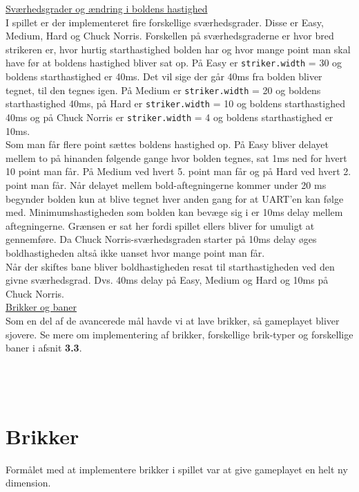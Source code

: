 \underline{Sværhedsgrader og ændring i boldens hastighed}\\

I spillet er der implementeret fire forskellige sværhedsgrader. Disse er Easy, Medium, Hard og Chuck Norris. Forskellen på sværhedsgraderne er hvor bred strikeren er, hvor hurtig starthastighed bolden har og hvor mange point man skal have før at boldens hastighed bliver sat op. På Easy er \texttt{striker.width} = 30 og boldens starthastighed er 40ms. Det vil sige der går 40ms fra bolden bliver tegnet, til den tegnes igen. På Medium er \texttt{striker.width} = 20 og boldens starthastighed 40ms, på Hard er \texttt{striker.width} = 10 og boldens starthastighed 40ms og på Chuck Norris er \texttt{striker.width} = 4 og boldens starthastighed er 10ms.\\

Som man får flere point sættes boldens hastighed op. På Easy bliver delayet mellem to på hinanden følgende gange hvor bolden tegnes, sat 1ms ned for hvert 10 point man får. På Medium ved hvert 5. point man får og på Hard ved hvert 2. point man får. Når delayet mellem bold-aftegningerne kommer under 20 ms begynder bolden kun at blive tegnet hver anden gang for at UART'en kan følge med. Minimumshastigheden som bolden kan bevæge sig i er 10ms delay mellem aftegningerne. Grænsen er sat her fordi spillet ellers bliver for umuligt at gennemføre. Da Chuck Norris-sværhedsgraden starter på 10ms delay øges boldhastigheden altså ikke uanset hvor mange point man får.\\
Når der skiftes bane bliver boldhastigheden resat til starthastigheden ved den givne sværhedsgrad. Dvs. 40ms delay på Easy, Medium og Hard og 10ms på Chuck Norris.\\

\underline{Brikker og baner}\\

Som en del af de avancerede mål havde vi at lave brikker, så gameplayet bliver sjovere. Se mere om implementering af brikker, forskellige brik-typer og forskellige baner i afsnit \textbf{3.3}.\\ \\ \\ \\


\section{Brikker}

Formålet med at implementere brikker i spillet var at give gameplayet en helt ny dimension.\\

